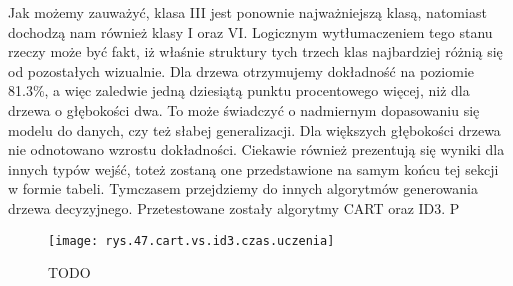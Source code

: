 Jak możemy zauważyć, klasa III jest ponownie najważniejszą klasą, natomiast dochodzą nam również klasy I oraz VI. Logicznym wytłumaczeniem tego stanu rzeczy może być fakt, iż właśnie struktury tych trzech klas najbardziej różnią się od pozostałych wizualnie. Dla drzewa otrzymujemy dokładność na poziomie 81.3\%, a więc zaledwie jedną dziesiątą punktu procentowego więcej, niż dla drzewa o głębokości dwa. To może świadczyć o nadmiernym dopasowaniu się modelu do danych, czy też słabej generalizacji. Dla większych głębokości drzewa nie odnotowano wzrostu dokładności. Ciekawie również prezentują się wyniki dla innych typów wejść, toteż zostaną one przedstawione na samym końcu tej sekcji w formie tabeli. Tymczasem przejdziemy do innych algorytmów generowania drzewa decyzyjnego. Przetestowane zostały algorytmy CART oraz ID3. P

\begin{figure}[h]
    \centering
    \texttt{[image: rys.47.cart.vs.id3.czas.uczenia]}
    \caption{TODO}
    \label{rys.47.cart.vs.id3.czas.uczenia}
\end{figure}

%
%
%
%
%
%
%

